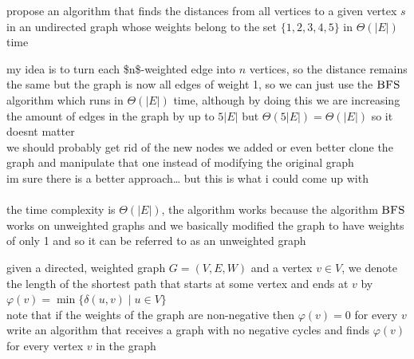 \documentclass[a4paper,12pt]{article}
\begin{document}
\begin{question}
propose an algorithm that finds the distances from all vertices to a given vertex \(s\) in an undirected graph whose weights belong to the set \(\{1,2,3,4,5\}\) in \(\Theta(|E|)\) time\\
\begin{answer}
my idea is to turn each \$n\$-weighted edge into \(n\) vertices, so the distance remains the same but the graph is now all edges of weight 1, so we can just use the \(\textsc{BFS}\) algorithm which runs in \(\Theta(|E|)\) time, although by doing this we are increasing the amount of edges in the graph by up to \(5|E|\) but \(\Theta(5|E|)=\Theta(|E|)\) so it doesnt matter\\
we should probably get rid of the new nodes we added or even better clone the graph and manipulate that one instead of modifying the original graph\\
im sure there is a better approach\ldots{} but this is what i could come up with\\
\\

the time complexity is \(\Theta(|E|)\), the algorithm works because the algorithm \(\textsc{BFS}\) works on unweighted graphs and we basically modified the graph to have weights of only 1 and so it can be referred to as an unweighted graph\\
\end{answer}
\end{question}
\begin{question}
given a directed, weighted graph \(G=(V,E,W)\) and a vertex \(v \in V\), we denote the length of the shortest path that starts at some vertex and ends at \(v\) by \(\varphi(v)=\min\{\delta(u,v) \mid u \in V\}\)\\
note that if the weights of the graph are non-negative then \(\varphi(v)=0\) for every \(v\)\\
write an algorithm that receives a graph with no negative cycles and finds \(\varphi(v)\) for every vertex \(v\) in the graph\\
\\
\end{question}
\end{document}
